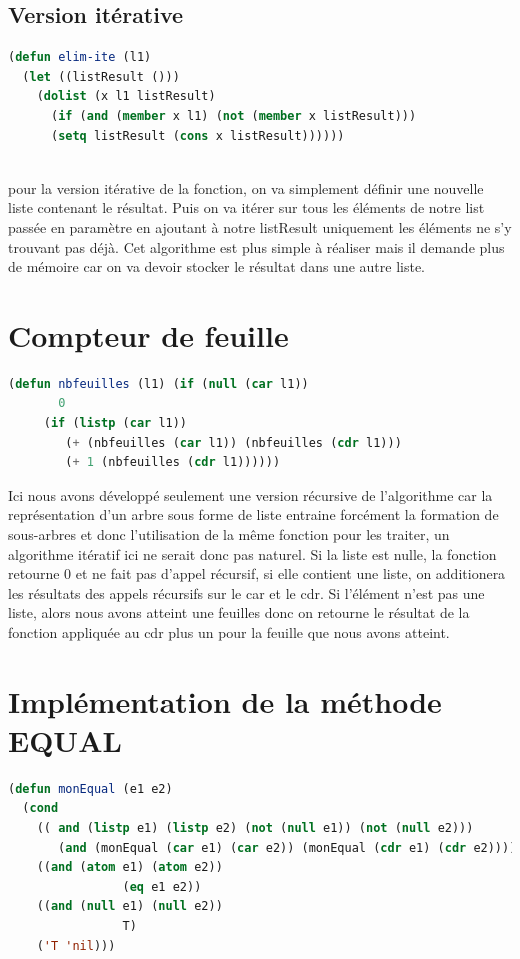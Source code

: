 \documentclass[a4paper,10pt]{report}
\begin{document}
        \subsection{Version itérative}
	\begin{lstlisting}[language=Lisp]
(defun elim-ite (l1)
  (let ((listResult ()))
    (dolist (x l1 listResult)
      (if (and (member x l1) (not (member x listResult)))
	  (setq listResult (cons x listResult))))))
	
	\end{lstlisting}

	pour la version itérative de la fonction, on va simplement définir une nouvelle liste contenant le résultat. Puis on va itérer sur tous les éléments de notre list passée en 
	paramètre en ajoutant à notre listResult uniquement les éléments ne s'y trouvant pas déjà.\newline
	Cet algorithme est plus simple à réaliser mais il demande plus de mémoire car on va devoir stocker le résultat dans une autre liste.
	
	\section{Compteur de feuille}
	
	   \begin{lstlisting}[language=Lisp]
(defun nbfeuilles (l1) (if (null (car l1))
	   0
	 (if (listp (car l1)) 
	    (+ (nbfeuilles (car l1)) (nbfeuilles (cdr l1))) 
	    (+ 1 (nbfeuilles (cdr l1))))))
	  \end{lstlisting}

	Ici nous avons développé seulement une version récursive de l'algorithme car la représentation d'un arbre sous forme de liste entraine forcément la formation de sous-arbres et donc l'utilisation
	de la même fonction pour les traiter, un algorithme itératif ici ne serait donc pas naturel. Si la liste est nulle, la fonction retourne 0 et ne fait pas d'appel récursif,
	si elle contient une liste, on additionera les résultats des appels récursifs sur le car et le cdr. Si l'élément n'est pas une liste, alors nous avons atteint une feuilles
	donc on retourne le résultat de la fonction appliquée au cdr plus un pour la feuille que nous avons atteint.
	
	
	\section{Implémentation de la méthode EQUAL}
	  \begin{lstlisting}[language=Lisp]
(defun monEqual (e1 e2)
  (cond 
    (( and (listp e1) (listp e2) (not (null e1)) (not (null e2)))
       (and (monEqual (car e1) (car e2)) (monEqual (cdr e1) (cdr e2))))
    ((and (atom e1) (atom e2))
                (eq e1 e2))
    ((and (null e1) (null e2))
                T)
    ('T 'nil)))
	  \end{lstlisting}
\end{document}
